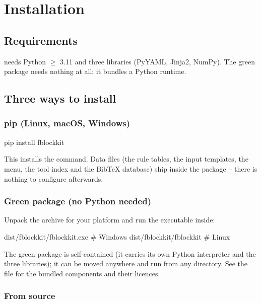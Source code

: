 \chapter{Installation}
\label{ch:installation}

\section{Requirements}

\fbk{} needs Python $\ge$ 3.11 and three libraries (PyYAML, Jinja2, NumPy).
The green package needs nothing at all: it bundles a Python runtime.

\section{Three ways to install}

\subsection{pip (Linux, macOS, Windows)}

\begin{codeblock}
pip install fblockkit
\end{codeblock}

This installs the \cmd{} command. Data files (the rule tables, the input
templates, the menu, the tool index and the BibTeX database) ship inside the
package -- there is nothing to configure afterwards.

\subsection{Green package (no Python needed)}

Unpack the archive for your platform and run the executable inside:

\begin{codeblock}
dist/fblockkit/fblockkit.exe      # Windows
dist/fblockkit/fblockkit          # Linux
\end{codeblock}

The green package is self-contained (it carries its own Python interpreter and
the three libraries); it can be moved anywhere and run from any directory.
See the  file for the bundled components and their licences.

\subsection{From source}

